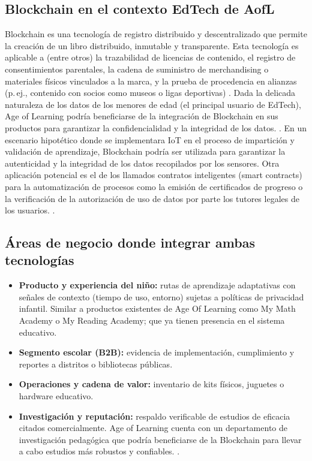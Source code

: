\documentclass[conference]{IEEEtran}
\begin{document}
\subsection{Blockchain en el contexto EdTech de AofL}
Blockchain es una tecnología de registro distribuido y descentralizado que permite la creación de un libro distribuido, inmutable y transparente. Esta tecnología es aplicable a (entre otros) la trazabilidad de licencias de contenido, el registro de consentimientos parentales, la cadena de suministro de merchandising o materiales físicos vinculados a la marca, y la prueba de procedencia en alianzas (p.\,ej., contenido con socios como museos o ligas deportivas) \cite{teloexplico2021blockchain,itainnova2020iotBlockchain}.
Dada la delicada naturaleza de los datos de los menores de edad (el principal usuario de EdTech), Age of Learning podría beneficiarse de la integración de Blockchain en sus productos para garantizar la confidencialidad y la integridad de los datos. \cite{dwEspanol2022blockchainLatam}.
En un escenario hipotético donde se implementara IoT en el proceso de impartición y validación de aprendizaje, Blockchain podría ser utilizada para garantizar la autenticidad y la integridad de los datos recopilados por los sensores.
Otra aplicación potencial es el de los llamados contratos inteligentes (smart contracts) para la automatización de procesos como la emisión de certificados de progreso o la verificación de la autorización de uso de datos por parte los tutores legales de los usuarios. \cite{itainnova2020iotBlockchain}.

\subsection{Áreas de negocio donde integrar ambas tecnologías}
\begin{itemize}
    \item \textbf{Producto y experiencia del niño:} rutas de aprendizaje adaptativas con señales de contexto (tiempo de uso, entorno) sujetas a políticas de privacidad infantil. Similar a productos existentes de Age Of Learning como My Math Academy o My Reading Academy; que ya tienen presencia en el sistema educativo.
    \item \textbf{Segmento escolar (B2B):} evidencia de implementación, cumplimiento y reportes a distritos o bibliotecas públicas.
    \item \textbf{Operaciones y cadena de valor:} inventario de kits físicos, juguetes o hardware educativo\cite{dwEspanol2022blockchainLatam}.
    \item \textbf{Investigación y reputación:} respaldo verificable de estudios de eficacia citados comercialmente. Age of Learning cuenta con un departamento de investigación pedagógica que podría beneficiarse de la Blockchain para llevar a cabo estudios más robustos y confiables. \cite{kulkarni2025edtech}.
\end{itemize}
\end{document}
